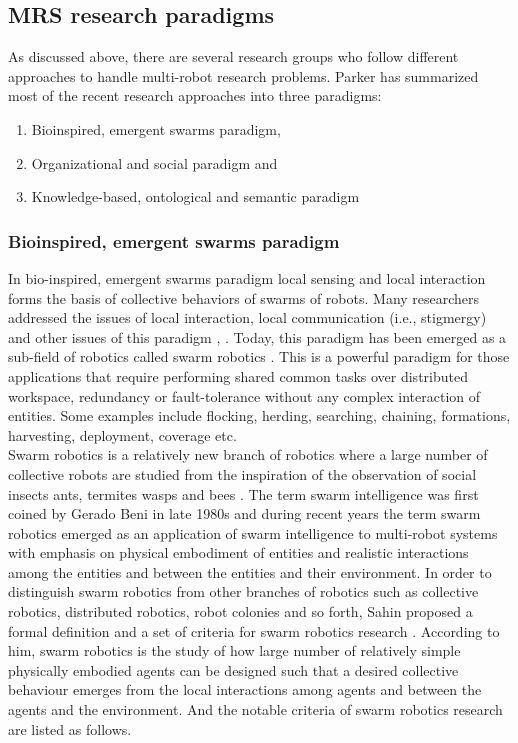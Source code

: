  \subsection{MRS research paradigms}
\label{bg:mrs:paradigms}
As discussed above, there are several research groups who follow different approaches to handle multi-robot research problems. Parker \cite{Parker2008} has summarized most of the recent research approaches into three paradigms:
\begin{enumerate}
\item Bioinspired, emergent swarms paradigm,
\item Organizational and social paradigm and
\item Knowledge-based, ontological and semantic paradigm
\end{enumerate}
\subsubsection*{Bioinspired, emergent swarms paradigm}
In bio-inspired, emergent swarms paradigm local sensing and local interaction forms the basis of collective behaviors of swarms of robots. Many researchers addressed the issues of local interaction, local communication (i.e., stigmergy) and other issues of this paradigm \cite{Mataric1995}, \cite{Kube+1993}. Today, this paradigm has been emerged as a sub-field of robotics called swarm robotics \cite{Sahin+2005}. This is a powerful paradigm for those applications that require performing shared common tasks over distributed workspace, redundancy or fault-tolerance without any complex interaction of entities. Some examples include flocking, herding, searching, chaining, formations, harvesting, deployment, coverage etc. \\
Swarm robotics is a relatively new branch of robotics where a large number of collective robots are studied from the inspiration of the observation of social insects ants, termites wasps and bees \cite{Sahin+2005}. The term swarm intelligence was first coined by Gerado Beni \cite{Beni2005} in late 1980s and during recent years the term swarm robotics emerged as an application of swarm intelligence to multi-robot systems with emphasis on physical embodiment of entities and realistic interactions among the entities and between the entities and their environment. In order to distinguish swarm robotics from other branches of robotics such as collective robotics, distributed robotics, robot colonies and so forth, Sahin proposed a formal definition and a set of criteria for swarm robotics research \cite{Sahin+2005}. According to him, swarm robotics is the study of how large number of relatively simple physically embodied agents can be designed such that a desired collective behaviour emerges from the local interactions among agents and between the agents and the environment. And the notable criteria of swarm robotics research are listed as follows.
